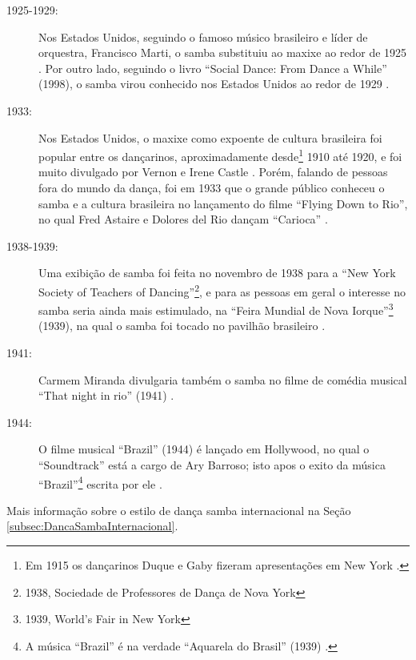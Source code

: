 \begin{description}
\item[1925-1929:] Nos Estados Unidos, seguindo o famoso músico brasileiro e líder de orquestra, 
Francisco Marti,
o samba substituiu ao maxixe ao redor de 1925 \cite[pp. 238]{hostetler1942walk}.
Por outro lado, seguindo o livro ``Social Dance: From Dance a While'' (1998),
o samba virou conhecido nos Estados Unidos ao redor de 1929
\cite[pp. 125]{harris1998social}.

\item[1933:] Nos Estados Unidos, o maxixe como expoente de cultura brasileira foi popular 
entre os dançarinos, aproximadamente desde\footnote{Em 
1915 os dançarinos Duque e Gaby fizeram apresentações em New York \cite[pp. 45]{maxixe1915duqueEEUU:1}.} 1910
até 1920, e foi muito divulgado por Vernon e Irene Castle \cite[pp. 44]{stephenson1992complete}.
Porém, falando de pessoas fora do mundo da dança, 
foi em 1933 que o grande público conheceu o samba e a cultura brasileira no lançamento do filme
``Flying Down to Rio'',
no qual Fred Astaire e Dolores del Rio dançam ``Carioca'' \cite[pp. 45]{maxixe1915duqueEEUU:1}.

\item[1938-1939:] Uma exibição de samba foi feita no novembro de 1938
para a ``New York Society of Teachers of Dancing''\footnote{1938, Sociedade de Professores de Dança de Nova York},
e para as pessoas em geral o interesse no samba seria ainda mais estimulado,
na ``Feira Mundial de Nova Iorque''\footnote{1939, World’s Fair in New York} (1939), 
na qual o samba foi tocado no pavilhão brasileiro  \cite[pp. 45]{maxixe1915duqueEEUU:1}.

\item[1941:] Carmem Miranda divulgaria também o samba no
 filme de comédia musical ``That night in rio'' (1941) \cite[pp. 45]{maxixe1915duqueEEUU:1}.

\item[1944:] O filme musical ``Brazil'' (1944) é lançado em Hollywood,
no qual o ``Soundtrack'' está a cargo de Ary Barroso;
isto apos o exito da música ``Brazil''\footnote{A 
música ``Brazil'' é na verdade ``Aquarela do Brasil'' (1939) 
\cite[pp. 73]{diniz2006almanaque} \cite[pp. 128]{perna2002samba} \cite[pp. 77]{fenerick2005nem}.} 
escrita por ele \cite[pp. 45]{maxixe1915duqueEEUU:1}.

\end{description}

Mais informação sobre o estilo de dança samba internacional na Seção \ref{subsec:DancaSambaInternacional}.

